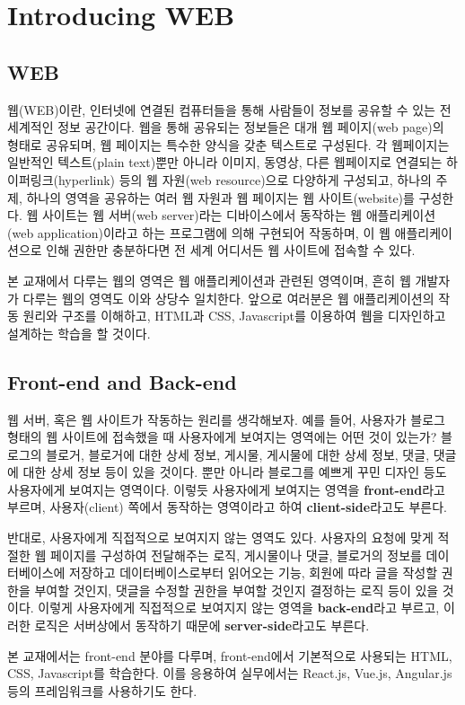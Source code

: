 \section{Introducing WEB} \label{sect:introducing-web}

\subsection*{WEB}
웹(WEB)이란, 인터넷에 연결된 컴퓨터들을 통해 사람들이 정보를 공유할 수 있는 전 세계적인 정보 공간이다. 웹을 통해 공유되는 정보들은 대개 웹 페이지(web page)의 형태로 공유되며, 웹 페이지는 특수한 양식을 갖춘 텍스트로 구성된다. 각 웹페이지는 일반적인 텍스트(plain text)뿐만 아니라 이미지, 동영상, 다른 웹페이지로 연결되는 하이퍼링크(hyperlink) 등의 웹 자원(web resource)으로 다양하게 구성되고, 하나의 주제, 하나의 영역을 공유하는 여러 웹 자원과 웹 페이지는 웹 사이트(website)를 구성한다. 웹 사이트는 웹 서버(web server)라는 디바이스에서 동작하는 웹 애플리케이션(web application)이라고 하는 프로그램에 의해 구현되어 작동하며, 이 웹 애플리케이션으로 인해 권한만 충분하다면 전 세계 어디서든 웹 사이트에 접속할 수 있다.

본 교재에서 다루는 웹의 영역은 웹 애플리케이션과 관련된 영역이며, 흔히 웹 개발자가 다루는 웹의 영역도 이와 상당수 일치한다. 앞으로 여러분은 웹 애플리케이션의 작동 원리와 구조를 이해하고, HTML과 CSS, Javascript를 이용하여 웹을 디자인하고 설계하는 학습을 할 것이다.

\subsection*{Front-end and Back-end}
웹 서버, 혹은 웹 사이트가 작동하는 원리를 생각해보자. 예를 들어, 사용자가 블로그 형태의 웹 사이트에 접속했을 때 사용자에게 보여지는 영역에는 어떤 것이 있는가? 블로그의 블로거, 블로거에 대한 상세 정보, 게시물, 게시물에 대한 상세 정보, 댓글, 댓글에 대한 상세 정보 등이 있을 것이다. 뿐만 아니라 블로그를 예쁘게 꾸민 디자인 등도 사용자에게 보여지는 영역이다. 이렇듯 사용자에게 보여지는 영역을 \textbf{front-end}라고 부르며, 사용자(client) 쪽에서 동작하는 영역이라고 하여 \textbf{client-side}라고도 부른다.

반대로, 사용자에게 직접적으로 보여지지 않는 영역도 있다. 사용자의 요청에 맞게 적절한 웹 페이지를 구성하여 전달해주는 로직, 게시물이나 댓글, 블로거의 정보를 데이터베이스에 저장하고 데이터베이스로부터 읽어오는 기능, 회원에 따라 글을 작성할 권한을 부여할 것인지, 댓글을 수정할 권한을 부여할 것인지 결정하는 로직 등이 있을 것이다. 이렇게 사용자에게 직접적으로 보여지지 않는 영역을 \textbf{back-end}라고 부르고, 이러한 로직은 서버상에서 동작하기 때문에 \textbf{server-side}라고도 부른다.

    {}

본 교재에서는 front-end 분야를 다루며, front-end에서 기본적으로 사용되는 HTML, CSS, Javascript를 학습한다. 이를 응용하여 실무에서는 React.js, Vue.js, Angular.js 등의 프레임워크를 사용하기도 한다. 
